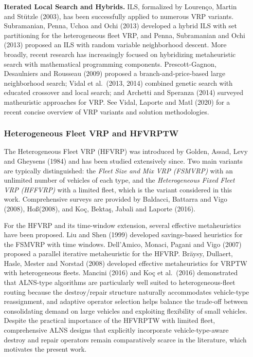 \documentclass[11pt]{article}
\begin{document}
\textbf{Iterated Local Search and Hybrids.} ILS, formalized by Louren\c{c}o, Martin and St\"utzle (2003), has been successfully applied to numerous VRP variants. Subramanian, Penna, Uchoa and Ochi (2013) developed a hybrid ILS with set partitioning for the heterogeneous fleet VRP, and Penna, Subramanian and Ochi (2013) proposed an ILS with random variable neighborhood descent. More broadly, recent research has increasingly focused on hybridizing metaheuristic search with mathematical programming components. Prescott-Gagnon, Desaulniers and Rousseau (2009) proposed a branch-and-price-based large neighborhood search; Vidal et al.\ (2013, 2014) combined genetic search with educated crossover and local search; and Archetti and Speranza (2014) surveyed matheuristic approaches for VRP. See Vidal, Laporte and Matl (2020) for a recent concise overview of VRP variants and solution methodologies.

\subsubsection{Heterogeneous Fleet VRP and HFVRPTW}

The Heterogeneous Fleet VRP (HFVRP) was introduced by Golden, Assad, Levy and Gheysens (1984) and has been studied extensively since. Two main variants are typically distinguished: the \emph{Fleet Size and Mix VRP (FSMVRP)} with an unlimited number of vehicles of each type, and the \emph{Heterogeneous Fixed Fleet VRP (HFFVRP)} with a limited fleet, which is the variant considered in this work. Comprehensive surveys are provided by Baldacci, Battarra and Vigo (2008), Ho\ss (2008), and Ko\c{c}, Bekta\c{s}, Jabali and Laporte (2016).

For the HFVRP and its time-window extension, several effective metaheuristics have been proposed. Liu and Shen (1999) developed savings-based heuristics for the FSMVRP with time windows. Dell'Amico, Monaci, Pagani and Vigo (2007) proposed a parallel iterative metaheuristic for the HFVRP. Br\"aysy, Dullaert, Hasle, Mester and Norstad (2008) developed effective metaheuristics for VRPTW with heterogeneous fleets. Mancini (2016) and Ko\c{c} et al.\ (2016) demonstrated that ALNS-type algorithms are particularly well suited to heterogeneous-fleet routing because the destroy/repair structure naturally accommodates vehicle-type reassignment, and adaptive operator selection helps balance the trade-off between consolidating demand on large vehicles and exploiting flexibility of small vehicles. Despite the practical importance of the HFVRPTW with limited fleet, comprehensive ALNS designs that explicitly incorporate vehicle-type-aware destroy and repair operators remain comparatively scarce in the literature, which motivates the present work.
\end{document}
